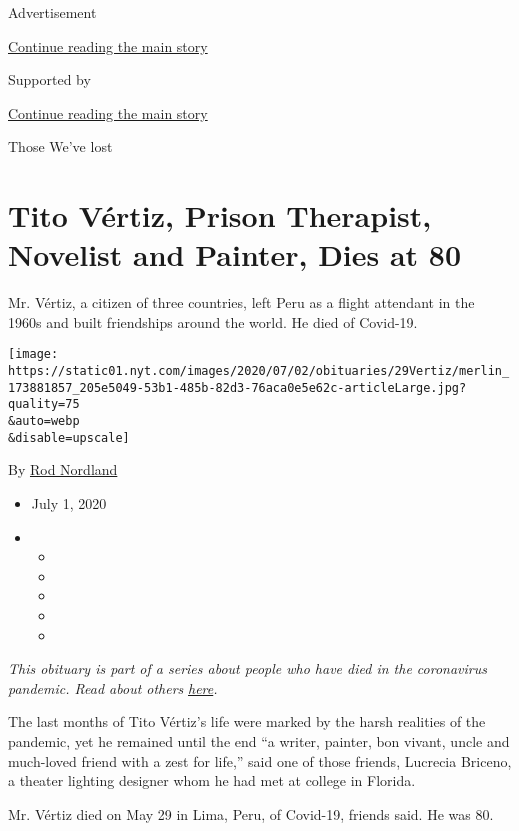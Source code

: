 Advertisement

\protect\hyperlink{after-top}{Continue reading the main story}

Supported by

\protect\hyperlink{after-sponsor}{Continue reading the main story}

Those We've lost

\hypertarget{tito-vuxe9rtiz-prison-therapist-novelist-and-painter-dies-at-80}{%
\section{Tito Vértiz, Prison Therapist, Novelist and Painter, Dies at
80}\label{tito-vuxe9rtiz-prison-therapist-novelist-and-painter-dies-at-80}}

Mr. Vértiz, a citizen of three countries, left Peru as a flight
attendant in the 1960s and built friendships around the world. He died
of Covid-19.

\texttt{[image: https://static01.nyt.com/images/2020/07/02/obituaries/29Vertiz/merlin\_173881857\_205e5049-53b1-485b-82d3-76aca0e5e62c-articleLarge.jpg?quality=75\\\&auto=webp\\\&disable=upscale]}

By \href{https://www.nytimes.com/by/rod-nordland}{Rod Nordland}

\begin{itemize}
\item
  July 1, 2020
\item
  \begin{itemize}
  \item
  \item
  \item
  \item
  \item
  \end{itemize}
\end{itemize}

\emph{This obituary is part of a series about people who have died in
the coronavirus pandemic. Read about others}
\href{https://www.nytimes.com/interactive/2020/obituaries/people-died-coronavirus-obituaries.html}{\emph{here}}\emph{.}

The last months of Tito Vértiz's life were marked by the harsh realities
of the pandemic, yet he remained until the end ``a writer, painter, bon
vivant, uncle and much-loved friend with a zest for life,'' said one of
those friends, Lucrecia Briceno, a theater lighting designer whom he had
met at college in Florida.

Mr. Vértiz died on May 29 in Lima, Peru, of Covid-19, friends said. He
was 80.


